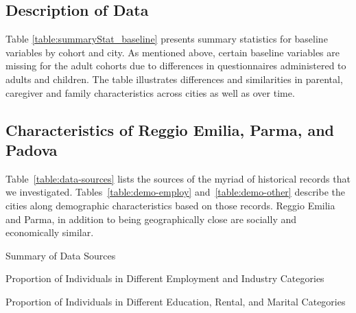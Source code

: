 \subsection{Description of Data}

Table \ref{table:summaryStat_baseline} presents summary statistics for baseline variables by cohort and city. As mentioned above, certain baseline variables are missing for the adult cohorts due to differences in questionnaires administered to adults and children. The table illustrates differences and similarities in parental, caregiver and family characteristics across cities as well as over time.

\begin{landscape}

\end{landscape}

\subsection{Characteristics of Reggio Emilia, Parma, and Padova}
\label{app:characteristics-cities}

Table~\ref{table:data-sources} lists the sources of the myriad of historical records that we investigated. Tables~\ref{table:demo-employ} and~\ref{table:demo-other} describe the cities along demographic characteristics based on those records. Reggio Emilia and Parma, in addition to being geographically close are socially and economically similar.

\begin{table}[H]
\centering
\footnotesize
	\caption{Summary of Data Sources} \label{table:data-sources}
	
\end{table}


\begin{landscape}
\begin{table}[ht!]
\begin{center}
\scriptsize{
	\caption{Proportion of Individuals in Different Employment and Industry Categories} \label{table:demo-employ}
	
}
\end{center}
\end{table}
\end{landscape}

\begin{landscape}
\begin{table}[ht!]
\begin{center}
\scriptsize{
	\caption{Proportion of Individuals in Different Education, Rental, and Marital Categories} \label{table:demo-other}
	
}
\end{center}
\end{table}
\end{landscape}



